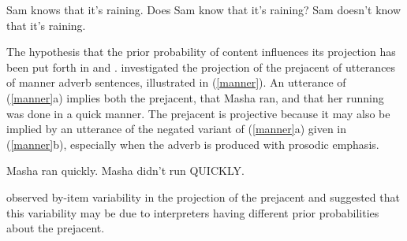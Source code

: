 \documentclass[11pt,fleqn]{article}
\newcommand{\6}{\mbox{$[\hspace*{-.6mm}[$}}
\newcommand{\9}{\mbox{$]\hspace*{-.6mm}]$}}
\begin{document}
\begin{exe}
\ex\label{know}
\begin{xlist}
\ex\label{ass} Sam knows that it's raining.
\ex\label{pq} Does Sam know that it's raining?
\ex\label{neg} Sam doesn't know that it's raining.
\end{xlist}
\end{exe}

%
%
%
%
%
%
%

The hypothesis that the prior probability of content influences its projection has been put forth in \citealt*{stevens-etal2017} and \citealt*{tbd-variability}. \citealt{stevens-etal2017} investigated the projection of the prejacent of utterances of manner adverb sentences, illustrated in (\ref{manner}). An utterance of (\ref{manner}a) implies both the prejacent, that Masha ran, and that her running was done in a quick manner. The prejacent is projective because it may also be implied by an utterance of the negated variant of (\ref{manner}a) given in (\ref{manner}b), especially when the adverb is produced with prosodic emphasis. 

\begin{exe}
\ex\label{manner} \citealt[1144]{stevens-etal2017}
\begin{xlist}
\ex Masha ran quickly.
\ex Masha didn't run QUICKLY.
\end{xlist}
\end{exe}
\citealt{stevens-etal2017} observed by-item variability in the projection of the prejacent and suggested that this variability may be due to interpreters having different prior probabilities about the prejacent.
\end{document}

